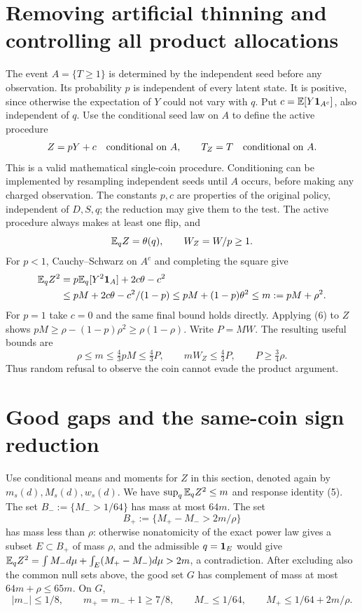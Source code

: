 \section{Removing artificial thinning and controlling all product allocations}
The event $A=\{T\ge1\}$ is determined by the independent seed before any
observation. Its probability $p$ is independent of every latent state. It is
positive, since otherwise the expectation of $Y$ could not vary with $q$.
Put $c=\mathbb E[Y\mathbf1_{A^c}]$, also independent of $q$.
Use the conditional seed law on $A$ to define the active procedure
\[
 Z=pY+c\quad\hbox{conditional on }A,
 \qquad T_Z=T\quad\hbox{conditional on }A.
\]
This is a valid mathematical single-coin procedure. Conditioning can be
implemented by resampling independent seeds until $A$ occurs, before making
any charged observation. The constants $p,c$ are properties of the original
policy, independent of $D,S,q$; the reduction may give them to the test.
The active procedure always makes at least one flip, and
\[
 \mathbb E_q Z=\theta(q),\qquad W_Z=W/p\ge1.
\]
For $p<1$, Cauchy--Schwarz on $A^c$ and completing the square give
\begin{align*}
 \mathbb E_q Z^2
 &=p\mathbb E_q[Y^2\mathbf1_A]+2c\theta-c^2\\
 &\le pM+2c\theta-c^2/(1-p)
 \le pM+(1-p)\theta^2
 \le m:=pM+\rho^2.
\end{align*}
For $p=1$ take $c=0$ and the same final bound holds directly.
Applying (6) to $Z$ shows
$pM\ge\rho-(1-p)\rho^2\ge\rho(1-\rho)$.
Write $P=MW$. The resulting useful bounds are
\[
 \rho\le m\le\tfrac43pM\le\tfrac43P,
 \qquad mW_Z\le\tfrac43P,
 \qquad P\ge\tfrac34\rho.                               \tag{7}
\]
Thus random refusal to observe the coin cannot evade the product argument.

\section{Good gaps and the same-coin sign reduction}
Use conditional means and moments for $Z$ in this section, denoted again by
$m_s(d),M_s(d),w_s(d)$. We have $\sup_q\mathbb E_qZ^2\le m$ and response identity (5).
The set $B_-:=\{M_->1/64\}$ has mass at most $64m$.
The set
\[
 B_+:=\{M_+-M_->2m/\rho\}
\]
has mass less than $\rho$: otherwise nonatomicity of the exact power law gives
a subset $E\subset B_+$ of mass $\rho$, and the admissible $q=\mathbf1_E$ would
give $\mathbb E_q Z^2=\int M_-d\mu+\int_E(M_+-M_-)d\mu>2m$, a contradiction.
After excluding also the common null sets above, the good set $G$ has complement
of mass at most $64m+\rho\le65m$. On $G$,
\[
 |m_-|\le1/8,\qquad m_+=m_-+1\ge7/8,
 \qquad M_-\le1/64,\qquad M_+\le1/64+2m/\rho.             \tag{8}
\]


